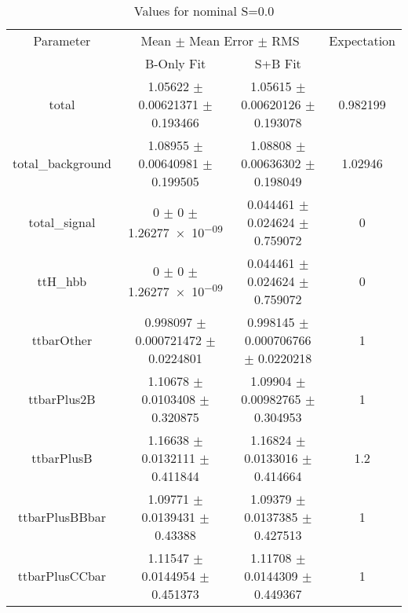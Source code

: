 \begin{table}
\centering
\caption{Values for nominal S=0.0}
\begin{tabular}{cccc}
\toprule
Parameter & \multicolumn{2}{c}{Mean $\pm$ Mean Error $\pm$ RMS} & Expectation\\
 & B-Only Fit & S+B Fit & \\
\midrule
total & \num{1.05622} $\pm$ \num{0.00621371} $\pm$ \num{0.193466} & \num{1.05615} $\pm$ \num{0.00620126} $\pm$ \num{0.193078} & \num{0.982199}\\
total\_background & \num{1.08955} $\pm$ \num{0.00640981} $\pm$ \num{0.199505} & \num{1.08808} $\pm$ \num{0.00636302} $\pm$ \num{0.198049} & \num{1.02946}\\
total\_signal & \num{0} $\pm$ \num{0} $\pm$ \num{1.26277e-09} & \num{0.044461} $\pm$ \num{0.024624} $\pm$ \num{0.759072} & \num{0}\\
ttH\_hbb & \num{0} $\pm$ \num{0} $\pm$ \num{1.26277e-09} & \num{0.044461} $\pm$ \num{0.024624} $\pm$ \num{0.759072} & \num{0}\\
ttbarOther & \num{0.998097} $\pm$ \num{0.000721472} $\pm$ \num{0.0224801} & \num{0.998145} $\pm$ \num{0.000706766} $\pm$ \num{0.0220218} & \num{1}\\
ttbarPlus2B & \num{1.10678} $\pm$ \num{0.0103408} $\pm$ \num{0.320875} & \num{1.09904} $\pm$ \num{0.00982765} $\pm$ \num{0.304953} & \num{1}\\
ttbarPlusB & \num{1.16638} $\pm$ \num{0.0132111} $\pm$ \num{0.411844} & \num{1.16824} $\pm$ \num{0.0133016} $\pm$ \num{0.414664} & \num{1.2}\\
ttbarPlusBBbar & \num{1.09771} $\pm$ \num{0.0139431} $\pm$ \num{0.43388} & \num{1.09379} $\pm$ \num{0.0137385} $\pm$ \num{0.427513} & \num{1}\\
ttbarPlusCCbar & \num{1.11547} $\pm$ \num{0.0144954} $\pm$ \num{0.451373} & \num{1.11708} $\pm$ \num{0.0144309} $\pm$ \num{0.449367} & \num{1}\\
\bottomrule
\end{tabular}
\end{table}